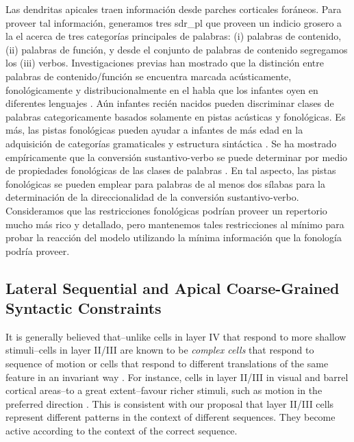 {Las dendritas apicales traen información desde parches corticales foráneos.
Para proveer tal información, generamos tres \gls{sdr_pl} que proveen un indicio grosero a la \gls{el} acerca de tres categorías principales de palabras: (i) palabras de contenido, (ii) palabras de función, y desde el conjunto de palabras de contenido segregamos los (iii) verbos.
Investigaciones previas han mostrado que la distinción entre palabras de contenido/función se encuentra marcada acústicamente, fonológicamente y distribucionalmente en el habla que los infantes oyen en diferentes lenguajes \cite{Shi1995PerceptualCO,shi_morgan_allopenna_1998}.
Aún infantes recién nacidos pueden discriminar clases de palabras categoricamente basados solamente en pistas acústicas y fonológicas.
Es más, las pistas fonológicas pueden ayudar a infantes de más edad en la adquisición de categorías gramaticales y estructura sintáctica \cite{shi_newborn_1999}.
Se ha mostrado empíricamente que la conversión sustantivo-verbo se puede determinar por medio de propiedades fonológicas de las clases de palabras \cite{lohmann_phonological_2017}.
En tal aspecto, las pistas fonológicas se pueden emplear para palabras de al menos dos sílabas para la determinación de la direccionalidad de la conversión sustantivo-verbo.
Consideramos que las restricciones fonológicas podrían proveer un repertorio mucho más rico y detallado, pero mantenemos tales restricciones al mínimo para probar la reacción del modelo utilizando la mínima información que la fonología podría proveer.
}{
\subsection{Lateral Sequential and Apical Coarse-Grained Syntactic Constraints}

It is generally believed that--unlike cells in layer IV that respond to more shallow stimuli--cells in layer II/III are known to be \emph{complex cells} that respond to sequence of motion or cells that respond to different translations of the same feature in an invariant way \cite{10.1371/journal.pcbi.1000532}.
For instance, cells in layer II/III in visual and barrel cortical areas--to a great extent--favour richer stimuli, such as motion in the preferred direction \cite{HIRSCH2006377}. This is consistent with our proposal that layer II/III cells represent different  patterns in the context of different sequences. They become active according to the context of the correct sequence.

}
